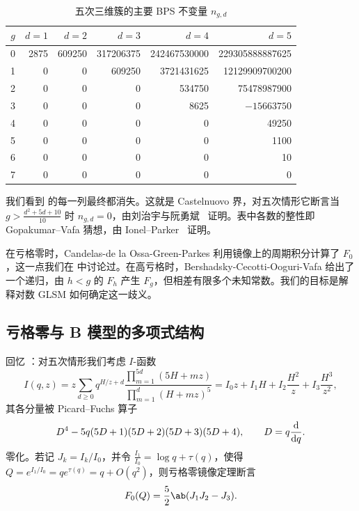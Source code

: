 \documentclass{amsart}
\theoremstyle{definition}
\theoremstyle{remark}
\theoremstyle{plain}
\theoremstyle{definition}
\theoremstyle{remark}
\newcommand{\1}{\mathbf{1}}
\newcommand{\2}{\mathbf{2}}
\newcommand{\3}{\mathbf{3}}
\begin{document}
\begin{table}[htpb]
    \centering
    \caption{五次三维簇的主要 BPS 不变量 \(n_{g,d}\)}
    \label{tab:quinticbps}
    \begin{tabular}{crrrrr}
        \toprule
        \(g\) & \(d=1\) & \(d=2\) & \(d=3\) & \(d=4\) & \(d=5\) \\
        \midrule
        0 & 2875 & 609250 & 317206375 & 242467530000 & 229305888887625 \\
        1 & 0 & 0 & 609250 & 3721431625 & 12129909700200 \\
        2 & 0 & 0 & 0 & 534750 & 75478987900 \\
        3 & 0 & 0 & 0 & 8625 & \(-15663750\) \\
        4 & 0 & 0 & 0 & 0 & 49250 \\
        5 & 0 & 0 & 0 & 0 & 1100 \\
        6 & 0 & 0 & 0 & 0 & 10 \\
        7 & 0 & 0 & 0 & 0 & 0 \\
        \bottomrule
    \end{tabular}
\end{table}

我们看到  的每一列最终都消失。这就是 Castelnuovo 界，对五次情形它断言当 \(g > \frac{d^2+5d+10}{10}\) 时 \(n_{g,d} = 0\)，由刘治宇与阮勇斌~\cite{LiuRuanCastelnuovo} 证明。表中各数的整性即 Gopakumar–Vafa 猜想，由 Ionel--Parker~\cite{IonelParker2018} 证明。

在亏格零时，Candelas-de la Ossa-Green-Parkes 利用镜像上的周期积分计算了 \(F_0\)，这一点我们在  中讨论过。在高亏格时，Bershadsky-Cecotti-Ooguri-Vafa 给出了一个递归，由 \(h < g\) 的 \(F_h\) 产生 \(F_g\)，但相差有限多个未知常数。我们的目标是解释对数 GLSM 如何确定这一歧义。

\subsection{亏格零与 B 模型的多项式结构}%
\label{sub:Genus zero and the polynomial structure of the B-model}

回忆 ：对五次情形我们考虑 \(I\)-函数
\[
    I(q,z) = z\sum_{d \geq 0} q^{H/z+d} \frac{\prod_{m=1}^{5d}(5H+mz)}{\prod_{m=1}^d (H+mz)^5} = I_0 z + I_1 H + I_2 \frac{H^2}{z} + I_3 \frac{H^3}{z^2},
\]
其各分量被 Picard–Fuchs 算子
\[ D^4 - 5q(5D+1)(5D+2)(5D+3)(5D+4), \qquad D = q \odv{}{q}. \]
零化。若记 \(J_k = I_k/I_0\)，并令 \(\frac{I_1}{I_0} = \log q + \tau(q)\)，使得 \(Q = e^{I_1/I_0} = qe^{\tau(q)} = q + O(q^2)\)，则亏格零镜像定理断言
\[ F_0(Q) = \frac{5}{2}\ab(J_1 J_2 - J_3). \]
\end{document}
